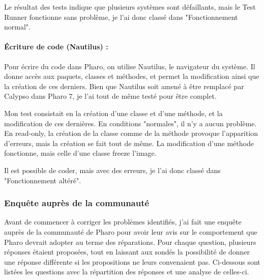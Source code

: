 Le résultat des tests indique que plusieurs systèmes sont défaillants, mais le Test Runner fonctionne sans problème, je l'ai donc classé dans "Fonctionnement normal".

\paragraph{Écriture de code (Nautilus) :}
Pour écrire du code dans Pharo, on utilise Nautilus, le navigateur du système. Il donne accès aux paquets, classes et méthodes, et permet la modification ainsi que la création de ces derniers. Bien que Nautilus soit amené à être remplacé par Calypso dans Pharo 7, je l'ai tout de même testé pour être complet.

Mon test consistait en la création d'une classe et d'une méthode, et la modification de ces dernières. En conditions "normales", il n'y a aucun problème. En read-only, la création de la classe comme de la méthode provoque l'apparition d'erreurs, mais la création se fait tout de même. La modification d'une méthode fonctionne, mais celle d'une classe freeze l'image.

Il est possible de coder, mais avec des erreurs, je l'ai donc classé dans "Fonctionnement altéré".



\subsubsection{Enquête auprès de la communauté}
Avant de commencer à corriger les problèmes identifiés, j'ai fait une enquête auprès de la communauté de Pharo pour avoir leur avis sur le comportement que Pharo devrait adopter au terme des réparations. Pour chaque question, plusieurs réponses étaient proposées, tout en laissant aux sondés la possibilité de donner une réponse différente si les propositions ne leurs convenaient pas. Ci-dessous sont listées les questions avec la répartition des réponses et une analyse de celles-ci.



